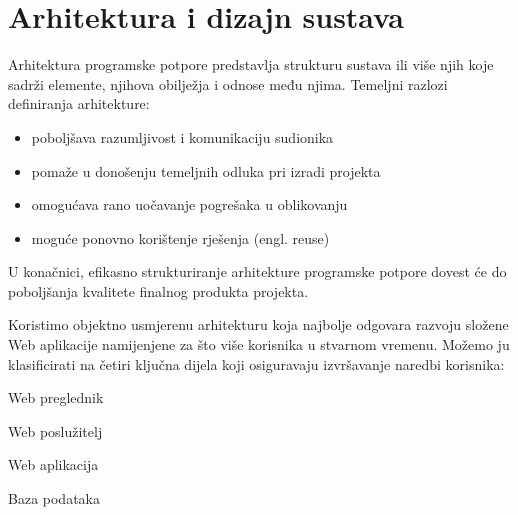 \chapter{Arhitektura i dizajn sustava}

		Arhitektura programske potpore predstavlja strukturu sustava ili više njih koje sadrži elemente, njihova obilježja i odnose među njima. Temeljni razlozi definiranja arhitekture:		

	\begin{itemize}
		\item 	{poboljšava razumljivost i komunikaciju sudionika}
		\item 	{pomaže u donošenju temeljnih odluka pri izradi projekta}
		\item 	{omogućava rano uočavanje pogrešaka u oblikovanju}		
		\item         {moguće ponovno korištenje rješenja (engl. reuse)}
	\end{itemize}

	U konačnici, efikasno strukturiranje arhitekture programske potpore dovest će do poboljšanja kvalitete finalnog produkta projekta.

	\vspace{10mm} %

	Koristimo objektno usmjerenu arhitekturu koja najbolje odgovara razvoju složene Web aplikacije namijenjene za što više korisnika u stvarnom vremenu. Možemo ju klasificirati na četiri ključna dijela koji osiguravaju izvršavanje naredbi korisnika: 
		
	\begin{packed_enum}
		\item 	{Web preglednik}
		\item 	{Web poslužitelj}
		\item 	{Web aplikacija}
		\item 	{Baza podataka}
	\end{packed_enum}			

